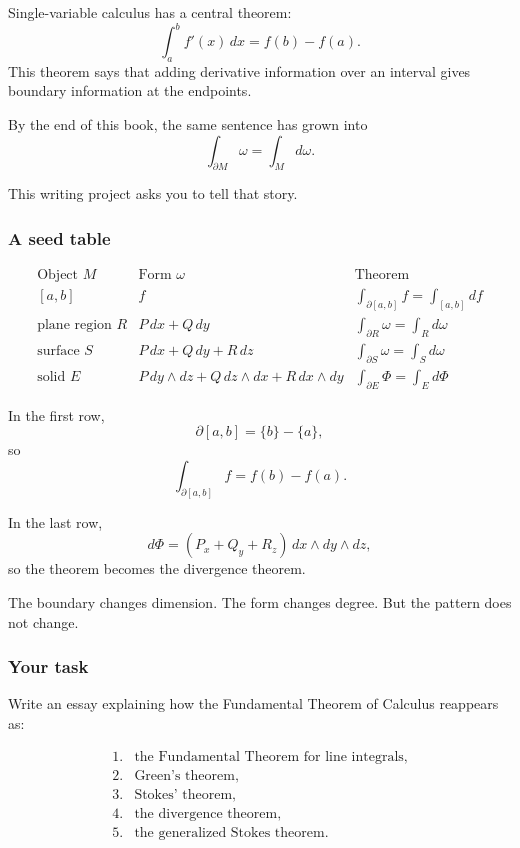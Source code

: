 Single-variable calculus has a central theorem:
\[
\boxed{
    \int_a^b f'(x)\,dx=f(b)-f(a).
}
\]
This theorem says that adding derivative information over an interval gives boundary
information at the endpoints.

By the end of this book, the same sentence has grown into
\[
\boxed{
    \int_{\partial M}\omega=\int_Md\omega.
}
\]

This writing project asks you to tell that story.

\subsubsection*{A seed table}

\[
\begin{array}{c|c|c}
\text{Object }M & \text{Form }\omega & \text{Theorem} \\ \hline
[a,b] & f &
\displaystyle
\int_{\partial[a,b]}f=\int_{[a,b]}df
\\[3mm]
\text{plane region }R & P\,dx+Q\,dy &
\displaystyle
\int_{\partial R}\omega=\int_Rd\omega
\\[3mm]
\text{surface }S & P\,dx+Q\,dy+R\,dz &
\displaystyle
\int_{\partial S}\omega=\int_Sd\omega
\\[3mm]
\text{solid }E &
P\,dy\wedge dz+Q\,dz\wedge dx+R\,dx\wedge dy
&
\displaystyle
\int_{\partial E}\Phi=\int_Ed\Phi
\end{array}
\]

In the first row,
\[
    \partial[a,b]=\{b\}-\{a\},
\]
so
\[
    \int_{\partial[a,b]}f=f(b)-f(a).
\]

In the last row,
\[
    d\Phi=(P_x+Q_y+R_z)\,dx\wedge dy\wedge dz,
\]
so the theorem becomes the divergence theorem.

The boundary changes dimension.  The form changes degree.  But the pattern does not
change.

\subsubsection*{Your task}

Write an essay explaining how the Fundamental Theorem of Calculus reappears as:

\[
\begin{array}{ll}
1. & \text{the Fundamental Theorem for line integrals,}\\
2. & \text{Green's theorem,}\\
3. & \text{Stokes' theorem,}\\
4. & \text{the divergence theorem,}\\
5. & \text{the generalized Stokes theorem.}
\end{array}
\]

